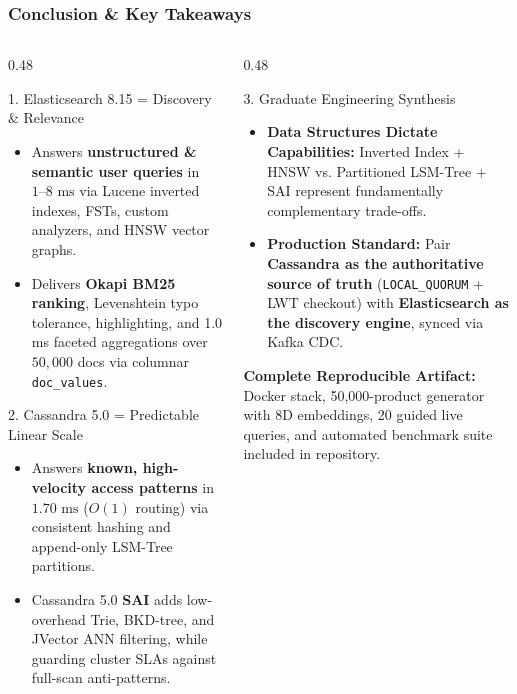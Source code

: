 \documentclass[aspectratio=169]{beamer}
\begin{document}
\begin{frame}
\frametitle{Conclusion \& Key Takeaways}
\begin{columns}[T]
\begin{column}{0.48\textwidth}
\begin{block}{\scriptsize 1. Elasticsearch 8.15 = Discovery \& Relevance}
\scriptsize
\begin{itemize}
    \item Answers \textbf{unstructured \& semantic user queries} in $1\text{--}8\text{ ms}$ via Lucene inverted indexes, FSTs, custom analyzers, and HNSW vector graphs.
    \item Delivers \textbf{Okapi BM25 ranking}, Levenshtein typo tolerance, highlighting, and 1.0 ms faceted aggregations over $50,000$ docs via columnar \texttt{doc\_values}.
\end{itemize}
\end{block}
\begin{block}{\scriptsize 2. Cassandra 5.0 = Predictable Linear Scale}
\scriptsize
\begin{itemize}
    \item Answers \textbf{known, high-velocity access patterns} in $1.70\text{ ms}$ ($O(1)$ routing) via consistent hashing and append-only LSM-Tree partitions.
    \item Cassandra 5.0 \textbf{SAI} adds low-overhead Trie, BKD-tree, and JVector ANN filtering, while guarding cluster SLAs against full-scan anti-patterns.
\end{itemize}
\end{block}
\end{column}
\begin{column}{0.48\textwidth}
\begin{alertblock}{\scriptsize 3. Graduate Engineering Synthesis}
\scriptsize
\begin{itemize}
    \item \textbf{Data Structures Dictate Capabilities:} Inverted Index + HNSW vs. Partitioned LSM-Tree + SAI represent fundamentally complementary trade-offs.
    \item \textbf{Production Standard:} Pair \textbf{Cassandra as the authoritative source of truth} (\texttt{LOCAL\_QUORUM} + LWT checkout) with \textbf{Elasticsearch as the discovery engine}, synced via Kafka CDC.
\end{itemize}
\end{alertblock}
\vspace{0.08cm}
\centering
\scriptsize
\textbf{Complete Reproducible Artifact:} Docker stack, 50,000-product generator with 8D embeddings, 20 guided live queries, and automated benchmark suite included in repository.
\end{column}
\end{columns}
\end{frame}
\end{document}
